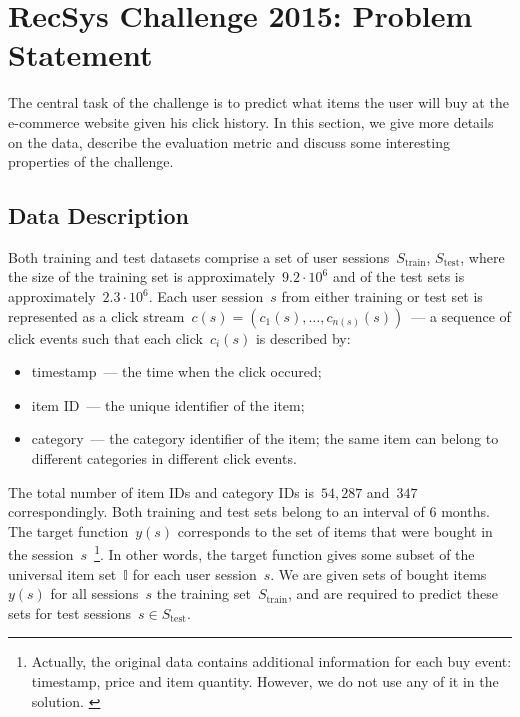 \documentclass{sig-alternate}
\begin{document}
\section{RecSys Challenge 2015: Problem Statement}
\label{sec:problem-statement}

The central task of the challenge is to predict what items the user will buy at the e-commerce website
given his click history.
In this section, we give more details on the data, describe the evaluation metric and
discuss some interesting properties of the challenge.

\subsection{Data Description}
Both training and test datasets comprise a set of user sessions~$S_\text{train}$,
$S_\text{test}$, where the size of the training set is approximately~$9.2 \cdot 10^6$
and of the test sets is approximately~$2.3\cdot 10^6$.
Each user session~$s$ from either training or test set
is represented as a click stream~$c(s) = (c_1(s), \dots, c_{n(s)}(s))$~---
a sequence of click events such that each click~$c_i(s)$ is described by:
\begin{itemize}
    \item timestamp~--- the time when the click occured;
    \item item ID~--- the unique identifier of the item;
    \item category~--- the category identifier of the item;
        the same item can belong to different categories in different click events.
\end{itemize}
The total number of item IDs and category IDs is~$54,287$ and~$347$ correspondingly.
Both training and test sets belong to an interval of 6 months.
The target function~$y(s)$ corresponds to the set of items that were bought in the session~$s$~\footnote{\small{
    Actually, the original data contains additional information
    for each buy event: timestamp, price and item quantity. However, we do not use any of it
    in the solution.
}}.
In other words, the target function gives some subset of the universal item set~$\mathbb{I}$
for each user session~$s$.
We are given sets of bought items~$y(s)$ for all sessions~$s$ the training set~$S_\text{train}$,
and are required to predict these sets for test sessions~$s \in S_\text{test}$.
\end{document}
